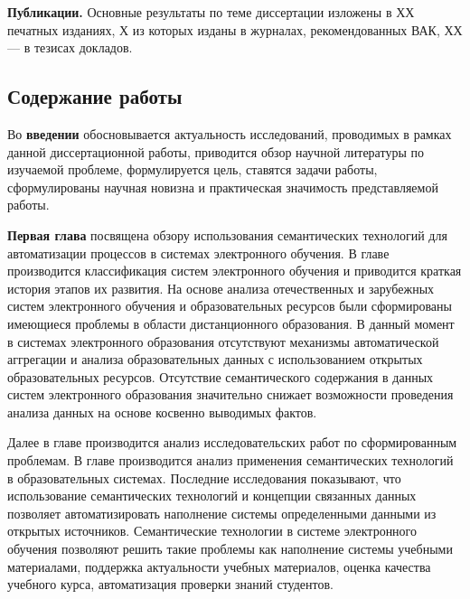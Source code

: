 
\textbf{Публикации.} Основные результаты по теме диссертации изложены в ХХ печатных изданиях, Х из которых изданы в журналах, рекомендованных ВАК, ХХ --- в тезисах докладов.


\subsection*{\Large Содержание работы}
Во \textbf{введении} обосновывается актуальность исследований, проводимых в рамках данной диссертационной работы, приводится обзор научной литературы по изучаемой проблеме, формулируется цель, ставятся задачи работы, сформулированы научная новизна и практическая значимость представляемой работы.

\textbf{Первая глава} посвящена обзору использования семантических технологий для автоматизации процессов в системах электронного обучения. В главе производится классификация систем электронного обучения и приводится краткая история этапов их развития. На основе анализа отечественных и зарубежных систем электронного обучения и образовательных ресурсов были сформированы имеющиеся проблемы в области дистанционного образования. В данный момент в системах электронного образования отсутствуют механизмы автоматической аггрегации и анализа образовательных данных с использованием открытых образовательных ресурсов. Отсутствие семантического содержания в данных систем электронного образования значительно снижает возможности проведения анализа данных на основе косвенно выводимых фактов.

Далее в главе производится анализ исследовательских работ по сформированным проблемам. В главе производится анализ применения семантических технологий в образовательных системах. Последние исследования показывают, что использование семантических технологий и концепции связанных данных позволяет автоматизировать наполнение системы определенными данными из открытых источников. Семантические технологии в системе электронного обучения позволяют решить такие проблемы как наполнение системы учебными материалами, поддержка актуальности учебных материалов, оценка качества учебного курса, автоматизация проверки знаний студентов.  

